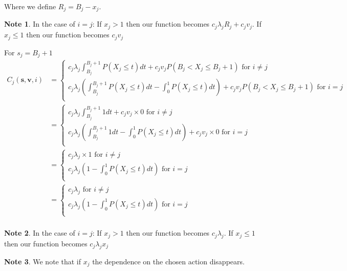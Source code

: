 \documentclass[a4paper,10pt]{article}
\theoremstyle{definition}
\theoremstyle{definition}
\theoremstyle{remark}
\theoremstyle{definition}
\newtheorem*{note}{Note}
\begin{document}
Where we define $R_{j}=B_{j}-x_{j}$.

\begin{note}
In the case of $i=j$: 
If $x_{j} > 1$ then our function becomes $c_{j} \lambda_{j} R_{j} + c_{j} v_{j}$.
If $x_{j} \leq 1$ then our function becomes $c_{j} v_{j}$
\end{note}


For $s_{j}=B_{j}+1$
\begin{align*}
C_{j}(\bm{s},\bm{v},i)&=\begin{cases}
c_{j} \lambda_{j} \int_{B_{j}}^{B_{j}+1} P(X_{j} \leq t) dt + c_{j} v_{j} P(B_{j} < X_{j} \leq B_{j}+1) \text{ for } i \neq j \\
c_{j} \lambda_{j} (\int_{B_{j}}^{B_{j}+1} P(X_{j} \leq t) dt - \int_{0}^{1} P(X_{j} \leq t) dt) + c_{j} v_{j} P(B_{j}< X_{j} \leq B_{j}+1) \text{ for } i=j \\
\end{cases} \\
&=\begin{cases}
c_{j} \lambda_{j} \int_{B_{j}}^{B_{j}+1} 1 dt + c_{j} v_{j} \times 0 \text{ for } i \neq j \\
c_{j} \lambda_{j} (\int_{B_{j}}^{B_{j}+1} 1 dt - \int_{0}^{1} P(X_{j} \leq t) dt) + c_{j} v_{j} \times 0 \text{ for } i=j \\
\end{cases} \\
&=\begin{cases}
c_{j} \lambda_{j} \times 1 \text{ for } i \neq j \\
c_{j} \lambda_{j} (1 - \int_{0}^{1} P(X_{j} \leq t) dt) \text{ for } i=j \\
\end{cases} \\
&=\begin{cases}
c_{j} \lambda_{j} \text{ for } i \neq j \\
c_{j} \lambda_{j} (1 - \int_{0}^{1} P(X_{j} \leq t) dt) \text{ for } i=j \\
\end{cases} \\
\end{align*}

\begin{note}
In the case of $i=j$: 
If $x_{j} > 1$ then our function becomes $c_{j} \lambda_{j}$.
If $x_{j} \leq 1$ then our function becomes $c_{j} \lambda_{j} x_{j}$
\end{note}

\begin{note}
We note that if $x_{j}$ the dependence on the chosen action disappears.
\end{note}
\end{document}
